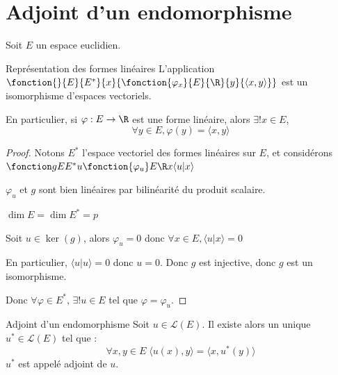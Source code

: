 \section{Adjoint d'un endomorphisme}

Soit $E$ un espace euclidien. 

\begin{theoreme}{Représentation des formes linéaires}{}
    L'application $\fonction{}{E}{E^*}{x}{\fonction{\varphi_x}{E}{\R}{y}{\langle x, y \rangle}}$ est un isomorphisme 
    d'espaces vectoriels. 

    En particulier, si $\varphi : E \to \R$ est une forme linéaire, alors $\exists ! x \in E$, 
    $$\forall y \in E, \varphi(y) = \langle x, y \rangle$$
\end{theoreme}


\begin{proof}
    Notons $E^*$ l'espace vectoriel des formes linéaires sur $E$, et considérons 
    $\fonction g E {E^*}{u}{\fonction{\varphi_u} E \R x {\langle u | x \rangle}}$

    $\varphi_u$ et $g$ sont bien linéaires par bilinéarité du produit scalaire.

    $\dim E= \dim E^* = p$

    Soit $u \in \ker(g)$, alors $\varphi_u = 0$ donc $\forall x \in E, \langle u | x \rangle = 0$

    En particulier, $\langle u | u \rangle = 0$ donc $u = 0$. Donc $g$ est injective, donc $g$ est un isomorphisme.

    Donc $\forall \varphi \in E^*$, $\exists ! u \in E$ tel que $\varphi = \varphi_u$. 
\end{proof}

\begin{definition}{Adjoint d'un endomorphisme}{}
    Soit $u \in \mathscr L(E)$. Il existe alors un unique $u^* \in \mathscr L(E)$ tel que :
    $$\forall x, y \in E \; \langle u(x), y \rangle = \langle x, u^* (y) \rangle$$
    $u^*$ est appelé adjoint de $u$.
\end{definition}


